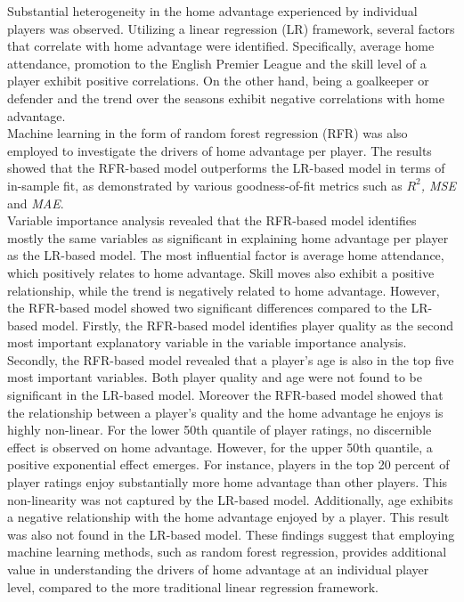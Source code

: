 \noindent
Substantial heterogeneity in the home advantage experienced by individual players was observed. Utilizing a linear regression (LR) framework, several factors that correlate with home advantage were identified. Specifically, average home attendance, promotion to the English Premier League and the skill level of a player exhibit positive correlations. On the other hand, being a goalkeeper or defender and the trend over the seasons exhibit negative correlations with home advantage. \\

\noindent
Machine learning in the form of random forest regression (RFR) was also employed to investigate the drivers of home advantage per player. The results showed that the RFR-based model outperforms the LR-based model in terms of in-sample fit, as demonstrated by various goodness-of-fit metrics such as \textit{$R^2$, MSE} and \textit{MAE}. \\

\noindent
Variable importance analysis revealed that the RFR-based model identifies mostly the same variables as significant in explaining home advantage per player as the LR-based model. The most influential factor is average home attendance, which positively relates to home advantage. Skill moves also exhibit a positive relationship, while the trend is negatively related to home advantage. However, the RFR-based model showed two significant differences compared to the LR-based model. Firstly, the RFR-based model identifies player quality as the second most important explanatory variable in the variable importance analysis. Secondly, the RFR-based model revealed that a player's age is also in the top five most important variables. Both player quality and age were not found to be significant in the LR-based model. Moreover the RFR-based model showed that the relationship between a player's quality and the home advantage he enjoys is highly non-linear. For the lower 50th quantile of player ratings, no discernible effect is observed on home advantage. However, for the upper 50th quantile, a positive exponential effect emerges. For instance, players in the top 20 percent of player ratings enjoy substantially more home advantage than other players. This non-linearity was not captured by the LR-based model. Additionally, age exhibits a negative relationship with the home advantage enjoyed by a player. This result was also not found in the LR-based model. These findings suggest that employing machine learning methods, such as random forest regression, provides additional value in understanding the drivers of home advantage at an individual player level, compared to the more traditional linear regression framework. \\

